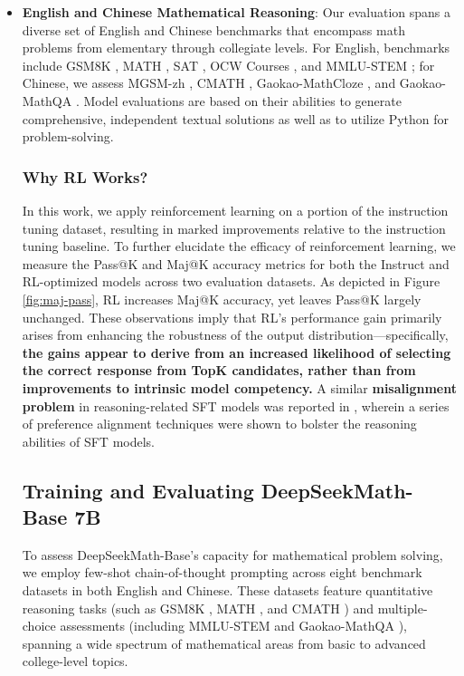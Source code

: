 {\begin{itemize}[topsep=0pt]
    \item \textbf{English and Chinese Mathematical Reasoning}: Our evaluation spans a diverse set of English and Chinese benchmarks that encompass math problems from elementary through collegiate levels. For English, benchmarks include GSM8K \citep{gsm8k}, MATH \citep{MATH}, SAT \citep{llemma}, OCW Courses \citep{minerva}, and MMLU-STEM \citep{mmlu}; for Chinese, we assess MGSM-zh \citep{mgsm}, CMATH \citep{wei2023cmath}, Gaokao-MathCloze \citep{agieval}, and Gaokao-MathQA \citep{agieval}. Model evaluations are based on their abilities to generate comprehensive, independent textual solutions as well as to utilize Python for problem-solving.

\subsubsection{Why RL Works?} In this work, we apply reinforcement learning on a portion of the instruction tuning dataset, resulting in marked improvements relative to the instruction tuning baseline. To further elucidate the efficacy of reinforcement learning, we measure the Pass@K and Maj@K accuracy metrics for both the Instruct and RL-optimized models across two evaluation datasets. As depicted in Figure \ref{fig:maj-pass}, RL increases Maj@K accuracy, yet leaves Pass@K largely unchanged. These observations imply that RL's performance gain primarily arises from enhancing the robustness of the output distribution—specifically, \textbf{the gains appear to derive from an increased likelihood of selecting the correct response from TopK candidates, rather than from improvements to intrinsic model competency.} A similar \textbf{misalignment problem} in reasoning-related SFT models was reported in \citep{wang2023making}, wherein a series of preference alignment techniques \citep{yuan2023rrhf,song2023preference,wang2023making} were shown to bolster the reasoning abilities of SFT models.

\subsection{Training and Evaluating DeepSeekMath-Base 7B}

To assess DeepSeekMath-Base's capacity for mathematical problem solving, we employ few-shot chain-of-thought prompting \citep{cot} across eight benchmark datasets in both English and Chinese. These datasets feature quantitative reasoning tasks (such as GSM8K \citep{gsm8k}, MATH \citep{MATH}, and CMATH \citep{wei2023cmath}) and multiple-choice assessments (including MMLU-STEM \citep{mmlu} and Gaokao-MathQA \citep{agieval}), spanning a wide spectrum of mathematical areas from basic to advanced college-level topics.


\end{itemize}}
